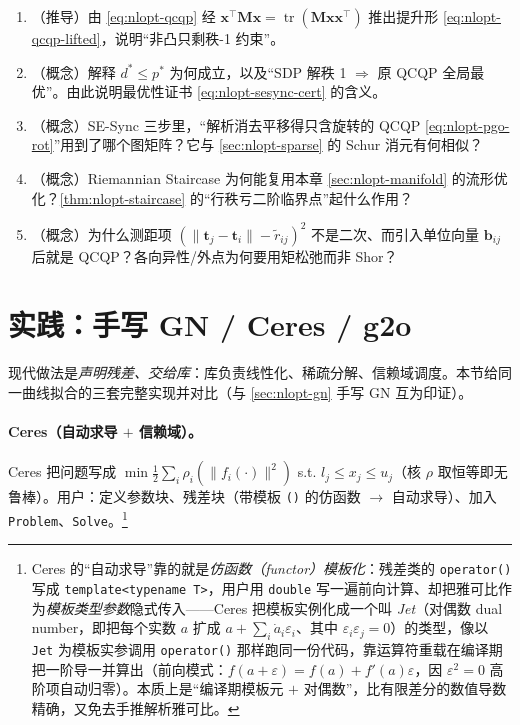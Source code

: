 \begin{practice}
\begin{enumerate}
  \item （推导）由 \cref{eq:nlopt-qcqp} 经 $\mathbf{x}^\top\mathbf{M}\mathbf{x}=\operatorname{tr}(\mathbf{M}\mathbf{x}\mathbf{x}^\top)$ 推出提升形 \cref{eq:nlopt-qcqp-lifted}，说明“非凸只剩秩-1 约束”。
  \item （概念）解释 $d^*\le p^*$ 为何成立，以及“SDP 解秩 1 $\Rightarrow$ 原 QCQP 全局最优”。由此说明最优性证书 \cref{eq:nlopt-sesync-cert} 的含义。
  \item （概念）SE-Sync 三步里，“解析消去平移得只含旋转的 QCQP \cref{eq:nlopt-pgo-rot}”用到了哪个图矩阵？它与 \cref{sec:nlopt-sparse} 的 Schur 消元有何相似？
  \item （概念）Riemannian Staircase 为何能复用本章 \cref{sec:nlopt-manifold} 的流形优化？\cref{thm:nlopt-staircase} 的“行秩亏二阶临界点”起什么作用？
  \item （概念）为什么测距项 $(\|\mathbf{t}_j-\mathbf{t}_i\|-\tilde r_{ij})^2$ 不是二次、而引入单位向量 $\mathbf{b}_{ij}$ 后就是 QCQP？各向异性/外点为何要用矩松弛而非 Shor？
\end{enumerate}
\end{practice}

\section{实践：手写 GN / Ceres / g2o}
\label{sec:nlopt-practice}

现代做法是\emph{声明残差、交给库}：库负责线性化、稀疏分解、信赖域调度。本节给同一曲线拟合的三套完整实现并对比（与 \cref{sec:nlopt-gn} 手写 GN 互为印证）。

\paragraph{Ceres（自动求导 $+$ 信赖域）。}\cite{gaoxiang2019slam14}
Ceres 把问题写成 $\min\tfrac12\sum_i\rho_i(\|f_i(\cdot)\|^2)$ s.t. $l_j\le x_j\le u_j$（核 $\rho$ 取恒等即无鲁棒）。用户：定义参数块、残差块（带模板 \texttt{()} 的仿函数 $\to$ 自动求导）、加入 \texttt{Problem}、\texttt{Solve}。\footnote{Ceres 的“自动求导”靠的就是\emph{仿函数（functor）模板化}：残差类的 \texttt{operator()} 写成 \texttt{template<typename T>}，用户用 \texttt{double} 写一遍前向计算、却把雅可比作为\emph{模板类型参数}隐式传入——Ceres 把模板实例化成一个叫 \emph{Jet}（对偶数 dual number，即把每个实数 $a$ 扩成 $a+\sum_i\dot a_i\varepsilon_i$、其中 $\varepsilon_i\varepsilon_j=0$）的类型，像以 \texttt{Jet} 为模板实参调用 \texttt{operator()} 那样跑同一份代码，靠运算符重载在编译期把一阶导一并算出（前向模式：$f(a+\varepsilon)=f(a)+f'(a)\varepsilon$，因 $\varepsilon^2=0$ 高阶项自动归零）\cite{gaoxiang2019slam14,agarwal2012ceres}。本质上是“编译期模板元 $+$ 对偶数”，比有限差分的数值导数精确，又免去手推解析雅可比。}

